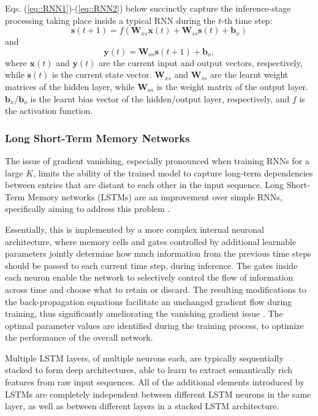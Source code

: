 \documentclass[preprint,review,10pt]{elsarticle}
\begin{document}
	Eqs. (\ref{eq::RNN1})-(\ref{eq::RNN2}) below succinctly capture the inference-stage processing taking place inside a typical RNN during the $t$-th time step:
	\begin{equation}
		\mathbf{s}(t+1) = f(\mathbf{W}_{xs} \mathbf{x}(t) + \mathbf{W}_{ss} \mathbf{s}(t) + \mathbf{b}_x)
		\label{eq::RNN1}
	\end{equation}
	\noindent and
	\begin{equation}
		\mathbf{y}(t) = \mathbf{W}_{os} \mathbf{s}(t+1) + \mathbf{b}_o,
		\label{eq::RNN2}
	\end{equation}
	\noindent where $\mathbf{x}(t)$ and $\mathbf{y}(t)$ are the current input and output vectors, respectively, while $\mathbf{s}(t)$ is the current state vector. $\mathbf{W}_{xs}$ and $\mathbf{W}_{ss}$ are the learnt weight matrices of the hidden layer, while $\mathbf{W}_{os}$ is the weight matrix of the output layer. $\mathbf{b}_x$/$\mathbf{b}_o$ is the learnt bias vector of the hidden/output layer, respectively, and $f$ is the activation function.
	
	\subsubsection{Long Short-Term Memory Networks}
	The issue of gradient vanishing, especially pronounced when training RNNs for a large $K$, limits the ability of the trained model to capture long-term dependencies between entries that are distant to each other in the input sequence. Long Short-Term Memory networks (LSTMs) are an improvement over simple RNNs, specifically aiming to address this problem \cite{sepp}.
	
	Essentially, this is implemented by a more complex internal neuronal architecture, where memory cells and gates controlled by additional learnable parameters jointly determine how much information from the previous time steps should be passed to each current time step, during inference. The gates inside each neuron enable the network to selectively control the flow of information across time and choose what to retain or discard. The resulting modifications to the back-propagation equations facilitate an unchanged gradient flow during training, thus significantly ameliorating the vanishing gradient issue \cite{calin}. The optimal parameter values are identified during the training process, to optimize the performance of the overall network.
	
	Multiple LSTM layers, of multiple neurons each, are typically sequentially stacked to form deep architectures, able to learn to extract semantically rich features from raw input sequences. All of the additional elements introduced by LSTMs are completely independent between different LSTM neurons in the same layer, as well as between different layers in a stacked LSTM architecture.
	
\end{document}
